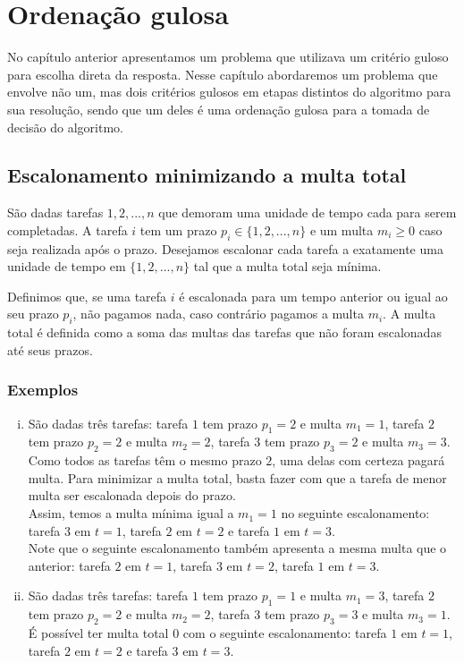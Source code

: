 \chapter{Ordenação gulosa}
\label{ordenacao}

No capítulo anterior apresentamos um problema que utilizava um critério guloso para escolha direta da resposta. Nesse capítulo abordaremos um problema que envolve não um, mas dois critérios gulosos em etapas distintos do algoritmo para sua resolução, sendo que um deles é uma ordenação gulosa para a tomada de decisão do algoritmo.

\section{Escalonamento minimizando a multa total}

São dadas tarefas $1, 2, ..., n$ que demoram uma unidade de tempo cada para serem completadas. A tarefa $i$ tem um prazo $p_i \in \{1, 2, ..., n\}$ e um multa $m_i \geq 0$ caso seja realizada após o prazo. Desejamos escalonar cada tarefa a exatamente uma unidade de tempo em $\{1, 2, ..., n\}$ tal que a multa total seja mínima.

Definimos que, se uma tarefa $i$ é escalonada para um tempo anterior ou igual ao seu prazo $p_i$, não pagamos nada, caso contrário pagamos a multa $m_i$. A multa total é definida como a soma das multas das tarefas que não foram escalonadas até seus prazos.

\subsection*{Exemplos}

\begin{enumerate}[i)]
    \item São dadas três tarefas: tarefa $1$ tem prazo $p_1 = 2$ e multa $m_1 = 1$, tarefa $2$ tem prazo $p_2 = 2$ e multa $m_2 = 2$, tarefa $3$ tem prazo $p_3 = 2$ e multa $m_3 = 3$.\\
    Como todos as tarefas têm o mesmo prazo $2$, uma delas com certeza pagará multa. Para minimizar a multa total, basta fazer com que a tarefa de menor multa ser escalonada depois do prazo.\\
    Assim, temos a multa mínima igual a $m_1 = 1$ no seguinte escalonamento: tarefa $3$ em $t = 1$, tarefa $2$ em $t = 2$ e tarefa $1$ em $t = 3$.\\
    Note que o seguinte escalonamento também apresenta a mesma multa que o anterior: tarefa $2$ em $t = 1$, tarefa $3$ em $t = 2$, tarefa $1$ em $t = 3$.
    \item São dadas três tarefas: tarefa $1$ tem prazo $p_1 = 1$ e multa $m_1 = 3$, tarefa $2$ tem prazo $p_2 = 2$ e multa $m_2 = 2$, tarefa $3$ tem prazo $p_3 = 3$ e multa $m_3 = 1$.\\
    É possível ter multa total $0$ com o seguinte escalonamento: tarefa $1$ em $t = 1$, tarefa $2$ em $t = 2$ e tarefa $3$ em $t = 3$.
\end{enumerate}

